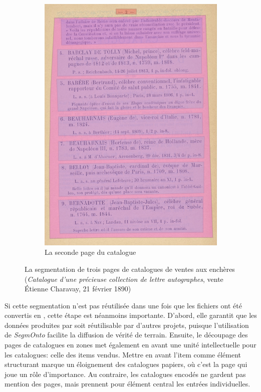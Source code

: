 \begin{figure}
\begin{subfigure}{0.33\textwidth}
		\includegraphics[width=\textwidth]{img/cat_000434_p2_zones.png}
		\caption{La seconde page du catalogue}
		\label{fig:catp2}
	\end{subfigure}
	\caption{La segmentation de trois pages de catalogues de ventes aux enchères (\textit{Catalogue d'une précieuse collection de lettre autographes}, vente Étienne Charavay, 21 février 1890)}
	\label{fig:catzones}
\end{figure}

Si cette segmentation n'est pas réutilisée dans une fois que les fichiers \alto{} ont été convertis en \tei{}, cette étape est néanmoins importante. D'abord, elle garantit que les données produites par \mssktb{} soit réutilisable par d'autres projets, puisque l'utilisation de \textit{SegmOnto} facilite la diffusion de vérité de terrain. Ensuite, le découpage des pages de catalogues en zones met également en avant une unité intellectuelle pour les catalogues: celle des items vendus. Mettre en avant l'item comme élément structurant marque un éloignement des catalogues papiers, où c'est la page qui joue un rôle d'importance. Au contraire, les catalogues encodés ne gardent pas mention des pages, mais prennent pour élément central les entrées individuelles.


